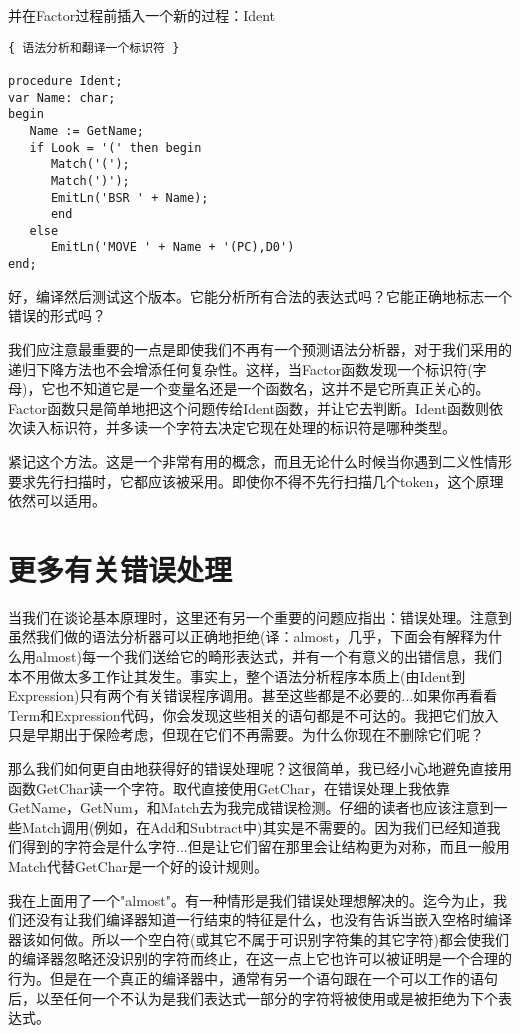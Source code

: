 并在Factor过程前插入一个新的过程：Ident

\begin{verbatim}
{ 语法分析和翻译一个标识符 }

procedure Ident;
var Name: char;
begin
   Name := GetName;
   if Look = '(' then begin
      Match('(');
      Match(')');
      EmitLn('BSR ' + Name);
      end
   else
      EmitLn('MOVE ' + Name + '(PC),D0')
end;
\end{verbatim}

好，编译然后测试这个版本。它能分析所有合法的表达式吗？它能正确地标志一个错误的形式吗？

我们应注意最重要的一点是即使我们不再有一个预测语法分析器，对于我们采用的递归下降方法也不会增添任何复杂性。这样，当Factor函数发现一个标识符(字母)，它也不知道它是一个变量名还是一个函数名，这并不是它所真正关心的。Factor函数只是简单地把这个问题传给Ident函数，并让它去判断。Ident函数则依次读入标识符，并多读一个字符去决定它现在处理的标识符是哪种类型。

紧记这个方法。这是一个非常有用的概念，而且无论什么时候当你遇到二义性情形要求先行扫描时，它都应该被采用。即使你不得不先行扫描几个token，这个原理依然可以适用。

\section{更多有关错误处理}

当我们在谈论基本原理时，这里还有另一个重要的问题应指出：错误处理。注意到虽然我们做的语法分析器可以正确地拒绝(译：almost，几乎，下面会有解释为什么用almost)每一个我们送给它的畸形表达式，并有一个有意义的出错信息，我们本不用做太多工作让其发生。事实上，整个语法分析程序本质上(由Ident到Expression)只有两个有关错误程序调用。甚至这些都是不必要的...如果你再看看Term和Expression代码，你会发现这些相关的语句都是不可达的。我把它们放入只是早期出于保险考虑，但现在它们不再需要。为什么你现在不删除它们呢？

那么我们如何更自由地获得好的错误处理呢？这很简单，我已经小心地避免直接用函数GetChar读一个字符。取代直接使用GetChar，在错误处理上我依靠GetName，GetNum，和Match去为我完成错误检测。仔细的读者也应该注意到一些Match调用(例如，在Add和Subtract中)其实是不需要的。因为我们已经知道我们得到的字符会是什么字符...但是让它们留在那里会让结构更为对称，而且一般用Match代替GetChar是一个好的设计规则。

我在上面用了一个"almost"。有一种情形是我们错误处理想解决的。迄今为止，我们还没有让我们编译器知道一行结束的特征是什么，也没有告诉当嵌入空格时编译器该如何做。所以一个空白符(或其它不属于可识别字符集的其它字符)都会使我们的编译器忽略还没识别的字符而终止，在这一点上它也许可以被证明是一个合理的行为。但是在一个真正的编译器中，通常有另一个语句跟在一个可以工作的语句后，以至任何一个不认为是我们表达式一部分的字符将被使用或是被拒绝为下个表达式。

